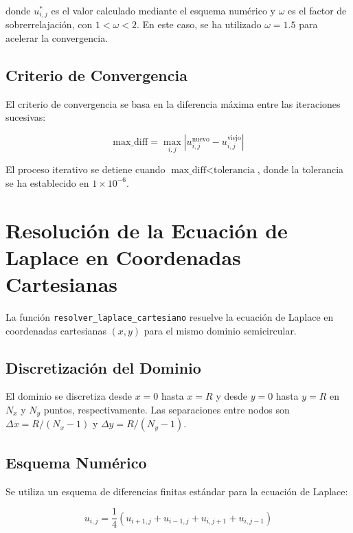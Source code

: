donde $u_{i,j}^{*}$ es el valor calculado mediante el esquema numérico y $\omega$ es el factor de sobrerrelajación, con $1 < \omega < 2$. En este caso, se ha utilizado $\omega = 1.5$ para acelerar la convergencia.

\subsection{Criterio de Convergencia}

El criterio de convergencia se basa en la diferencia máxima entre las iteraciones sucesivas:

\begin{equation} \text{max\_diff} = \max_{i,j} \left| u_{i,j}^{\text{nuevo}} - u_{i,j}^{\text{viejo}} \right| \end{equation}

El proceso iterativo se detiene cuando $\text{max\_diff} < \text{tolerancia}$, donde la tolerancia se ha establecido en $1 \times 10^{-6}$.

\section{Resolución de la Ecuación de Laplace en Coordenadas Cartesianas}

La función \texttt{resolver\_laplace\_cartesiano} resuelve la ecuación de Laplace en coordenadas cartesianas $(x, y)$ para el mismo dominio semicircular.

\subsection{Discretización del Dominio}

El dominio se discretiza desde $x = 0$ hasta $x = R$ y desde $y = 0$ hasta $y = R$ en $N_x$ y $N_y$ puntos, respectivamente. Las separaciones entre nodos son $\Delta x = R / (N_x - 1)$ y $\Delta y = R / (N_y - 1)$.

\subsection{Esquema Numérico}

Se utiliza un esquema de diferencias finitas estándar para la ecuación de Laplace:

\begin{equation} u_{i,j} = \frac{1}{4} \left( u_{i+1,j} + u_{i-1,j} + u_{i,j+1} + u_{i,j-1} \right) \end{equation}

